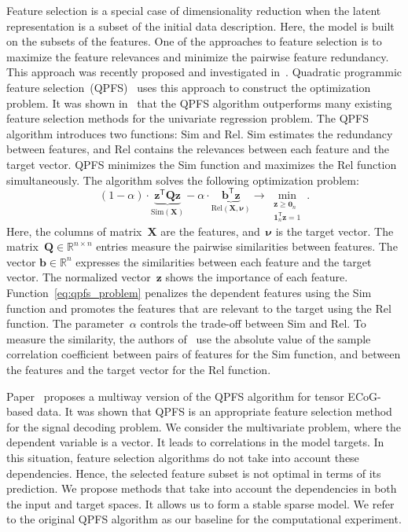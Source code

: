 \documentclass[12pt,twoside]{article}
\theoremstyle{definition}
\newcommand{\bz}{\mathbf{z}}
\newcommand{\bb}{\mathbf{b}}
\newcommand{\bX}{\mathbf{X}}
\newcommand{\bQ}{\mathbf{Q}}
\newcommand{\bbR}{\mathbb{R}}
\newcommand{\T}{\mathsf{T}}
\newcommand{\bnu}{\boldsymbol{\nu}}
\newcommand{\bOne}{\boldsymbol{1}}
\newcommand{\bZero}{\boldsymbol{0}}
\begin{document}
Feature selection is a special case of dimensionality reduction when the latent representation is a subset of the initial data description. 
Here, the model is built on the subsets of the features. 
One of the approaches to feature selection is to maximize the feature relevances and minimize the pairwise feature redundancy. 
This approach was recently proposed and investigated in~\cite{ding2005minimum,yamada2014high}.
Quadratic programmic feature selection~(QPFS)~\cite{rodriguez2010quadratic} uses this approach to construct the optimization problem. It was shown in~\cite{katrutsa2017comprehensive} that the QPFS algorithm outperforms many existing feature selection methods for the univariate regression problem. 
The QPFS algorithm introduces two functions: $\text{Sim}$ and $\text{Rel}$.
$\text{Sim}$ estimates the redundancy between features, and $\text{Rel}$ contains the relevances between each feature and the target vector.
QPFS minimizes the Sim function and maximizes the Rel function simultaneously.
The algorithm solves the following optimization problem:
\begin{equation}
(1 - \alpha) \cdot \underbrace{\bz^{\T} \bQ \bz}_{\text{Sim}(\bX)} - \alpha \cdot \underbrace{ \bb^{\T} \bz}_{\text{Rel} (\bX, \bnu)} \rightarrow \min_{\substack{\bz \geq \bZero_n \\ \bOne_n^{\T} \bz=1}}.
\label{eq:qpfs_problem}
\end{equation}
Here, the columns of matrix~$\bX$ are the features, and~$\bnu$ is the target vector. 
The matrix~$\bQ \in \bbR^{n \times n}$ entries measure the pairwise similarities between features.
The vector $\bb \in \bbR^n$ expresses the similarities between each feature and the target vector.
The normalized vector~$\bz$ shows the importance of each feature.
Function~\eqref{eq:qpfs_problem} penalizes the dependent features using the Sim function and promotes the features that are relevant to the target using the Rel function.
The parameter~$\alpha$ controls the trade-off between Sim and Rel.
To measure the similarity, the authors of~\cite{rodriguez2010quadratic} use the absolute value of the sample correlation coefficient between pairs of features for the Sim function, and between the features and the target vector for the Rel function.

Paper~\cite{motrenko2018multi} proposes a multiway version of the QPFS algorithm for tensor ECoG-based data. 
It was shown that QPFS is an appropriate feature selection method for the signal decoding problem.
We consider the multivariate problem, where the dependent variable is a vector. 
It leads to correlations in the model targets. 
In this situation, feature selection algorithms do not take into account these dependencies.
Hence, the selected feature subset is not optimal in terms of its prediction.
We propose methods that take into account the dependencies in both the input and target spaces. 
It allows us to form a stable sparse model.
We refer to the original QPFS algorithm as our baseline for the computational experiment.
\end{document}

